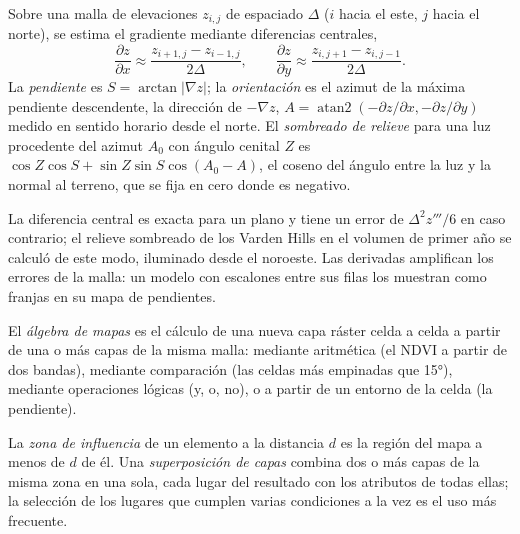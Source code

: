 \begin{method}\label{met:b3:remote-sensing-gis:slope}
Sobre una malla de elevaciones $z_{i,j}$ de espaciado $\Delta$ ($i$ hacia el este, $j$
hacia el norte), se estima el gradiente mediante diferencias centrales,
\[
\frac{\partial z}{\partial x} \approx \frac{z_{i+1,j} - z_{i-1,j}}{2\Delta} ,
\qquad
\frac{\partial z}{\partial y} \approx \frac{z_{i,j+1} - z_{i,j-1}}{2\Delta} .
\]
La \emph{pendiente} es $S = \arctan|\nabla z|$; la \emph{orientación} es el
azimut de la máxima pendiente descendente, la dirección de $-\nabla z$, $A =
\operatorname{atan2}(-\partial z/\partial x, -\partial z/\partial y)$
medido en sentido horario desde el norte. El \emph{sombreado de relieve} para una luz procedente del
azimut $A_0$ con ángulo cenital $Z$ es $\cos Z\cos S + \sin Z\sin S
\cos(A_0 - A)$, el coseno del ángulo entre la luz y la normal
al terreno, que se fija en cero donde es negativo.
\end{method}

La diferencia central es exacta para un plano y tiene un error de
$\Delta^2 z'''/6$ en caso contrario; el relieve sombreado de los Varden Hills en el
volumen de primer año se calculó de este modo, iluminado desde el noroeste. Las derivadas
amplifican los errores de la malla: un modelo con escalones entre sus filas los
muestran como franjas en su mapa de pendientes.

\begin{definition}\label{def:b3:remote-sensing-gis:map-algebra}
El \emph{álgebra de mapas} es el cálculo de una nueva capa ráster
celda a celda a partir de una o más capas de la misma malla: mediante aritmética
(el NDVI a partir de dos bandas), mediante comparación (las celdas más empinadas que
\ang{15}), mediante operaciones lógicas (y, o, no), o a partir de un entorno
de la celda (la pendiente).
\end{definition}

\begin{definition}\label{def:b3:remote-sensing-gis:operations}
La \emph{zona de influencia} de un elemento a la distancia $d$ es
la región del mapa a menos de $d$ de él. Una
\emph{superposición de capas} combina dos o más capas de la
misma zona en una sola, cada lugar del resultado con los atributos de
todas ellas; la selección de los lugares que cumplen varias condiciones a
la vez es el uso más frecuente.
\end{definition}

